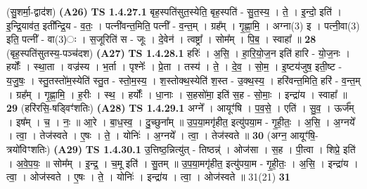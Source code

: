 \documentclass[17pt]{extarticle}
\begin{document}
                  \newline
                      (सु॒शर्मा॒-द्वाद॑श)  \textbf{(A26)} \newline \newline
                                \textbf{ TS 1.4.27.1} \newline
                  बृह॒स्पति॑सुत॒स्येति॒ बृह॒स्पति॑ - सु॒त॒स्य॒ । ते॒ । इ॒न्दो॒ इति॑ । इ॒न्द्रि॒याव॑त॒ इती᳚न्द्रि॒य - व॒तः॒ । पत्नी॑वन्त॒मिति॒ पत्नी᳚ - व॒न्त॒म् । ग्रह᳚म् । गृ॒ह्णा॒मि॒ । अग्ना(3) इ । पत्नी॒वा(3) इति॒ पत्नी᳚ - वा(3)ः । स॒जूरिति॑ स - जूः । दे॒वेन॑ । त्वष्ट्रा᳚ । सोम᳚म् । पि॒ब॒ । स्वाहा᳚ ॥ \textbf{  28} \newline
                  \newline
                      (बृह॒स्पति॑सुतस्य॒-पञ्च॑दश)  \textbf{(A27)} \newline \newline
                                \textbf{ TS 1.4.28.1} \newline
                  हरिः॑ । अ॒सि॒ । हा॒रि॒यो॒ज॒न इति॑ हारि - यो॒ज॒नः । हर्योः᳚ । स्था॒ता । वज्र॑स्य । भ॒र्ता । पृश्नेः᳚ । प्रे॒ता । तस्य॑ । ते॒ । दे॒व॒ । सो॒म॒ । इ॒ष्टय॑जुष॒ इती॒ष्ट - य॒जु॒षः॒ । स्तु॒तस्तो॑म॒स्येति॑ स्तु॒त - स्तो॒म॒स्य॒ । श॒स्तोक्थ॒स्येति॑ श॒स्त - उ॒क्थ॒स्य॒ । हरि॑वन्त॒मिति॒ हरि॑ - व॒न्त॒म् । ग्रह᳚म् । गृ॒ह्णा॒मि॒ । ह॒रीः । स्थ॒ । हर्योः᳚ । धा॒नाः । स॒हसो॑मा॒ इति॑ स॒ह - सो॒माः॒ । इन्द्रा॑य । स्वाहा᳚ ॥ \textbf{  29 } \newline
                  \newline
                      (हरि॑रसि॒-षड्विꣳ॑शतिः)  \textbf{(A28)} \newline \newline
                                \textbf{ TS 1.4.29.1} \newline
                  अग्ने᳚ । आयूꣳ॑षि । प॒व॒से॒ । एति॑ । सु॒व॒ । ऊर्ज᳚म् । इष᳚म् । च॒ । नः॒ ॥ आ॒रे । बा॒ध॒स्व॒ । दु॒च्छुना᳚म् ॥ उ॒प॒या॒मगृ॑हीत॒ इत्यु॑पया॒म - गृ॒ही॒तः॒ । अ॒सि॒ । अ॒ग्नये᳚ । त्वा॒ । तेज॑स्वते । ए॒षः । ते॒ । योनिः॑ । अ॒ग्नये᳚ । त्वा॒ । तेज॑स्वते ॥ \textbf{  30 } \newline
                  \newline
                      (अग्न॒ आयूꣳ॑षि॒-त्रयो॑विꣳशतिः)  \textbf{(A29)} \newline \newline
                                \textbf{ TS 1.4.30.1} \newline
                  उ॒त्तिष्ठ॒न्नित्यु॑त् - तिष्ठन्न्॑ । ओज॑सा । स॒ह । पी॒त्वा । शिप्रे॒ इति॑ । अ॒वे॒प॒यः॒ ॥ सोम᳚म् । इ॒न्द्र॒ । च॒मू इति॑ । सु॒तम् ॥ उ॒प॒या॒मगृ॑हीत॒ इत्यु॑पया॒म - गृ॒ही॒तः॒ । अ॒सि॒ । इन्द्रा॑य । त्वा॒ । ओज॑स्वते । ए॒षः । ते॒ । योनिः॑ । इन्द्रा॑य । त्वा॒ । ओज॑स्वते ॥ 31(21) \textbf{  31} \newline
\end{document}
